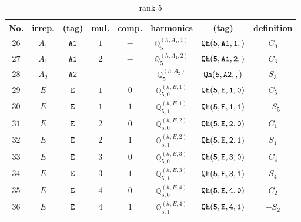 \documentclass[fleqn,8pt]{jsarticle}
\begin{document}
\begin{table}[ht!]
\begin{center}
\caption{rank 5}
\renewcommand{\arraystretch}{1.3}
\begin{tabular}{cccccccc} \hline \hline
No. & irrep. & (tag) & mul. & comp. & harmonics & (tag) & definition \\ \hline
$ 26 $ & $ A_{1} $ & $ {\tt A1} $ & $ 1 $ & $ - $ & $ \mathbb{Q}_{5}^{(h,A_{1},1)} $ & $ {\tt Qh(5,A1,1,)} $ & $ C_{0} $ \\
$ 27 $ & $ A_{1} $ & $ {\tt A1} $ & $ 2 $ & $ - $ & $ \mathbb{Q}_{5}^{(h,A_{1},2)} $ & $ {\tt Qh(5,A1,2,)} $ & $ C_{3} $ \\
$ 28 $ & $ A_{2} $ & $ {\tt A2} $ & $ - $ & $ - $ & $ \mathbb{Q}_{5}^{(h,A_{2})} $ & $ {\tt Qh(5,A2,,)} $ & $ S_{3} $ \\
$ 29 $ & $ E $ & $ {\tt E} $ & $ 1 $ & $ 0 $ & $ \mathbb{Q}_{5,0}^{(h,E,1)} $ & $ {\tt Qh(5,E,1,0)} $ & $ C_{5} $ \\
$ 30 $ & $ E $ & $ {\tt E} $ & $ 1 $ & $ 1 $ & $ \mathbb{Q}_{5,1}^{(h,E,1)} $ & $ {\tt Qh(5,E,1,1)} $ & $ - S_{5} $ \\
$ 31 $ & $ E $ & $ {\tt E} $ & $ 2 $ & $ 0 $ & $ \mathbb{Q}_{5,0}^{(h,E,2)} $ & $ {\tt Qh(5,E,2,0)} $ & $ C_{1} $ \\
$ 32 $ & $ E $ & $ {\tt E} $ & $ 2 $ & $ 1 $ & $ \mathbb{Q}_{5,1}^{(h,E,2)} $ & $ {\tt Qh(5,E,2,1)} $ & $ S_{1} $ \\
$ 33 $ & $ E $ & $ {\tt E} $ & $ 3 $ & $ 0 $ & $ \mathbb{Q}_{5,0}^{(h,E,3)} $ & $ {\tt Qh(5,E,3,0)} $ & $ C_{4} $ \\
$ 34 $ & $ E $ & $ {\tt E} $ & $ 3 $ & $ 1 $ & $ \mathbb{Q}_{5,1}^{(h,E,3)} $ & $ {\tt Qh(5,E,3,1)} $ & $ S_{4} $ \\
$ 35 $ & $ E $ & $ {\tt E} $ & $ 4 $ & $ 0 $ & $ \mathbb{Q}_{5,0}^{(h,E,4)} $ & $ {\tt Qh(5,E,4,0)} $ & $ C_{2} $ \\
$ 36 $ & $ E $ & $ {\tt E} $ & $ 4 $ & $ 1 $ & $ \mathbb{Q}_{5,1}^{(h,E,4)} $ & $ {\tt Qh(5,E,4,1)} $ & $ - S_{2} $ \\
 \hline \hline
\end{tabular}
\end{center}
\end{table}
\end{document}
